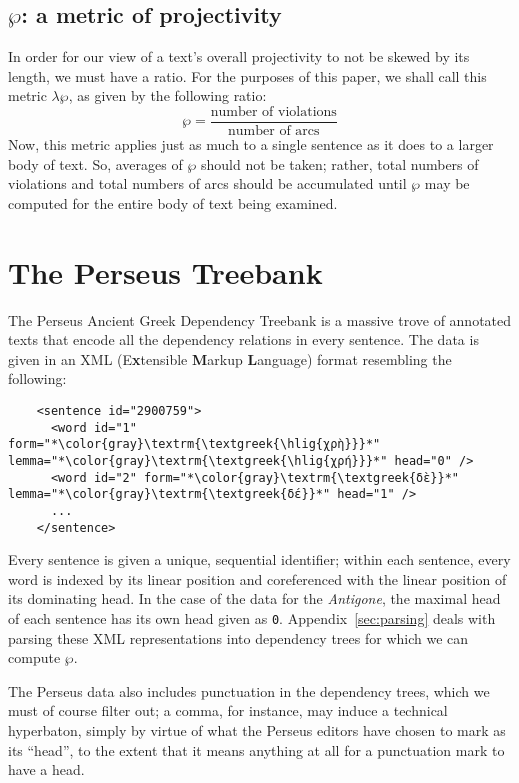 \documentclass{article}
\newcommand{\FN}{\mathsf}
\newcommand{\hlig}[1]{{\addfontfeature{Ligatures=Historical}{#1}}}
\begin{document}
\subsection{\ensuremath{\FN{\wp}}: a metric of projectivity}

In order for our view of a text's overall projectivity to not be skewed by its
length, we must have a ratio. For the purposes of this paper, we shall call this
metric \ensuremath{\lambda \FN{\wp}}, as given by the following ratio:
%
\[ \wp = \frac{\text{number of violations}}{\text{number of arcs}} \]
%
Now, this metric applies just as much to a single sentence as it does to a
larger body of text. So, averages of \ensuremath{\FN{\wp}} should not be taken; rather, total
numbers of violations and total numbers of arcs should be accumulated until
\ensuremath{\FN{\wp}} may be computed for the entire body of text being examined.

\section{The Perseus Treebank}
%
The Perseus Ancient Greek Dependency Treebank is a massive trove of annotated
texts that encode all the dependency relations in every sentence. The data is
given in an XML (E\textbf{x}tensible \textbf{M}arkup \textbf{L}anguage) format
resembling the following:

\lstset{
  language=XML,
  escapeinside=**
}

\begin{lstlisting}
    <sentence id="2900759">
      <word id="1" form="*\color{gray}\textrm{\textgreek{\hlig{χρὴ}}}*" lemma="*\color{gray}\textrm{\textgreek{\hlig{χρή}}}*" head="0" />
      <word id="2" form="*\color{gray}\textrm{\textgreek{δὲ}}*" lemma="*\color{gray}\textrm{\textgreek{δέ}}*" head="1" />
      ...
    </sentence>
\end{lstlisting}

\noindent
%
Every sentence is given a unique, sequential identifier; within each sentence,
every word is indexed by its linear position and coreferenced with the linear
position of its dominating head. In the case of the data for the \emph{Antigone},
the maximal head of each sentence has its own head given as \lstinline{0}.
Appendix~\ref{sec:parsing} deals with parsing these XML representations into
dependency trees for which we can compute \ensuremath{\FN{\wp}}.

The Perseus data also includes punctuation in the dependency trees, which we
must of course filter out; a comma, for instance, may induce a technical
hyperbaton, simply by virtue of what the Perseus editors have chosen to mark as
its ``head'', to the extent that it means anything at all for a punctuation mark
to have a head.
\end{document}
